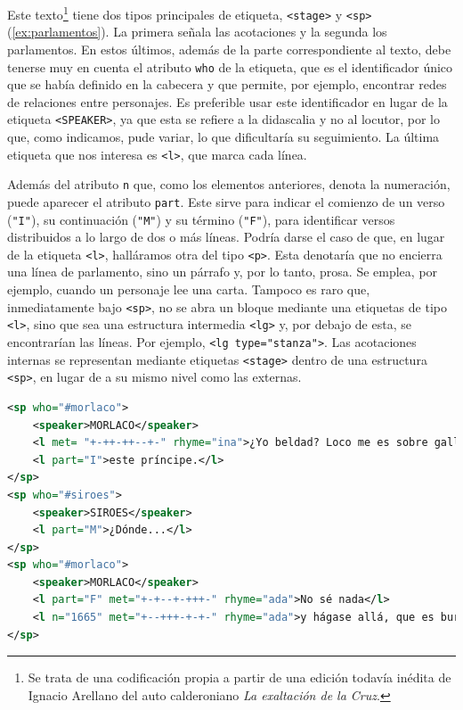 Este texto\footnote{Se trata de una codificación propia a partir de una edición todavía inédita de Ignacio Arellano del auto calderoniano \textit{La exaltación de la Cruz}.} tiene dos tipos principales de etiqueta, \texttt{<stage>} y \texttt{<sp>} (\ref{ex:parlamentos}). La primera señala las acotaciones y la segunda los parlamentos. En estos últimos, además de la parte correspondiente al texto, debe tenerse muy en cuenta el atributo  \texttt{who} de la etiqueta, que es el identificador único que se había definido en la cabecera y que permite, por ejemplo, encontrar redes de relaciones entre personajes. Es preferible usar este identificador en lugar de la etiqueta \texttt{<SPEAKER>}, ya que esta se refiere a la didascalia y no al locutor, por lo que, como indicamos, pude variar, lo que dificultaría su seguimiento. La última etiqueta que nos interesa es \texttt{<l>}, que marca cada línea.

Además del atributo \texttt{n} que, como los elementos anteriores, denota la numeración, puede aparecer el atributo \texttt{part}. Este sirve para indicar el comienzo de un verso (\texttt{"I"}), su continuación (\texttt{"M"}) y su término (\texttt{"F"}), para identificar versos distribuidos a lo largo de dos o más líneas. Podría darse el caso de que, en lugar de la etiqueta \texttt{<l>}, halláramos otra del tipo \texttt{<p>}. Esta denotaría que no encierra una línea de parlamento, sino un párrafo y, por lo tanto, prosa. Se emplea, por ejemplo, cuando un personaje lee una carta. Tampoco es raro que, inmediatamente bajo \texttt{<sp>}, no se abra un bloque mediante una etiquetas de tipo \texttt{<l>}, sino que sea una estructura intermedia \texttt{<lg>} y, por debajo de esta, se encontrarían las líneas. Por ejemplo, \texttt{<lg type="stanza">}. Las acotaciones internas se representan mediante etiquetas \texttt{<stage>} dentro de una estructura \texttt{<sp>}, en lugar de a su mismo nivel como las externas.


\begin{exe}
	\ex\label{ex:parlamentos}\begin{lstlisting}[language=xml,upquote=true,numbers=none]
<sp who="#morlaco">
    <speaker>MORLACO</speaker>
    <l met= "+-++-++--+-" rhyme="ina">¿Yo beldad? Loco me es sobre gallina</l>
    <l part="I">este príncipe.</l>
</sp>
<sp who="#siroes">
    <speaker>SIROES</speaker>
    <l part="M">¿Dónde...</l>
</sp>
<sp who="#morlaco">
    <speaker>MORLACO</speaker>
    <l part="F" met="+-+--+-+++-" rhyme="ada">No sé nada</l>
    <l n="1665" met="+--+++-+-+-" rhyme="ada">y hágase allá, que es burla muy pesada.</l>
</sp>
\end{lstlisting}\end{exe}

